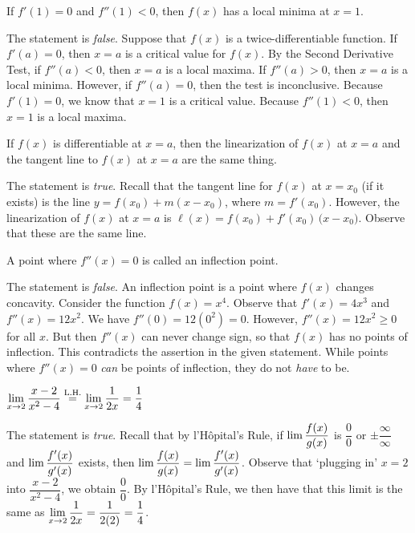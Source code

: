 \documentclass[11pt,letterpaper]{article}
\begin{document}
 If $f'(1)= 0$ and $f''(1) < 0$, then $f(x)$ has a local minima at $x= 1$. \pspace

\sol The statement is \textit{false}. Suppose that $f(x)$ is a twice-differentiable function. If $f'(a)= 0$, then $x= a$ is a critical value for $f(x)$. By the Second Derivative Test, if $f''(a) < 0$, then $x= a$ is a local maxima. If $f''(a) > 0$, then $x= a$ is a local minima. However, if $f''(a)= 0$, then the test is inconclusive. Because $f'(1)= 0$, we know that $x= 1$ is a critical value. Because $f''(1) < 0$, then $x= 1$ is a local maxima. \pvspace{1.3cm}



 If $f(x)$ is differentiable at $x= a$, then the linearization of $f(x)$ at $x= a$ and the tangent line to $f(x)$ at $x= a$ are the same thing. \pspace

\sol The statement is \textit{true}. Recall that the tangent line for $f(x)$ at $x= x_0$ (if it exists) is the line $y= f(x_0) + m(x - x_0)$, where $m= f'(x_0)$. However, the linearization of $f(x)$ at $x= a$ is $\ell(x)= f(x_0) + f'(x_0) \, \big(x - x_0 \big)$. Observe that these are the same line. \pvspace{1.3cm}



\newpage



  A point where $f''(x)= 0$ is called an inflection point. \pspace

\sol The statement is \textit{false}. An inflection point is a point where $f(x)$ changes concavity. Consider the function $f(x)= x^4$. Observe that $f'(x)= 4x^3$ and $f''(x)=12x^2$. We have $f''(0)= 12(0^2)= 0$. However, $f''(x)= 12x^2 \geq 0$ for all $x$. But then $f''(x)$ can never change sign, so that $f(x)$ has no points of inflection. This contradicts the assertion in the given statement. While points where $f''(x)= 0$ \textit{can} be points of inflection, they do not \textit{have} to be. \pvspace{1.3cm}



 $\displaystyle\lim_{x \to 2} \dfrac{x - 2}{x^2 - 4} \stackrel{\text{L.H.}}{=} \lim_{x \to 2} \dfrac{1}{2x}= \dfrac{1}{4}$ \pspace

\sol The statement is \textit{true}. Recall that by l'H\^opital's Rule, if $\displaystyle\lim \dfrac{f(x)}{g(x)}$ is $\dfrac{0}{0}$ or $\pm\dfrac{\infty}{\infty}$ and $\displaystyle\lim \dfrac{f'(x)}{g'(x)}$ exists, then $\displaystyle\lim \dfrac{f(x)}{g(x)}= \lim \dfrac{f'(x)}{g'(x)}$. Observe that `plugging in' $x= 2$ into $\dfrac{x - 2}{x^2 - 4}$, we obtain $\dfrac{0}{0}$. By l'H\^opital's Rule, we then have that this limit is the same as $\displaystyle\lim_{x \to 2} \dfrac{1}{2x}= \dfrac{1}{2(2)}= \dfrac{1}{4}$. \pvspace{1.3cm}
\end{document}
